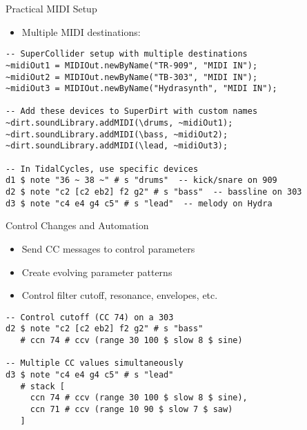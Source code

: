 \documentclass{beamer}
\begin{document}
\begin{frame}[fragile]{Practical MIDI Setup}
\begin{itemize}
    \item Multiple MIDI destinations: 
\end{itemize}

\begin{lstlisting}[style=tidal]
-- SuperCollider setup with multiple destinations
~midiOut1 = MIDIOut.newByName("TR-909", "MIDI IN");
~midiOut2 = MIDIOut.newByName("TB-303", "MIDI IN");
~midiOut3 = MIDIOut.newByName("Hydrasynth", "MIDI IN");

-- Add these devices to SuperDirt with custom names
~dirt.soundLibrary.addMIDI(\drums, ~midiOut1);
~dirt.soundLibrary.addMIDI(\bass, ~midiOut2);
~dirt.soundLibrary.addMIDI(\lead, ~midiOut3);

-- In TidalCycles, use specific devices
d1 $ note "36 ~ 38 ~" # s "drums"  -- kick/snare on 909
d2 $ note "c2 [c2 eb2] f2 g2" # s "bass"  -- bassline on 303
d3 $ note "c4 e4 g4 c5" # s "lead"  -- melody on Hydra
\end{lstlisting}
\end{frame}

\begin{frame}[fragile]{Control Changes and Automation}
\begin{itemize}
    \item Send CC messages to control parameters
    \item Create evolving parameter patterns
    \item Control filter cutoff, resonance, envelopes, etc.
\end{itemize}

\begin{lstlisting}[style=tidal]
-- Control cutoff (CC 74) on a 303
d2 $ note "c2 [c2 eb2] f2 g2" # s "bass"
   # ccn 74 # ccv (range 30 100 $ slow 8 $ sine)

-- Multiple CC values simultaneously
d3 $ note "c4 e4 g4 c5" # s "lead"
   # stack [
     ccn 74 # ccv (range 30 100 $ slow 8 $ sine),
     ccn 71 # ccv (range 10 90 $ slow 7 $ saw)
   ]
\end{lstlisting}
\end{frame}
\end{document}
